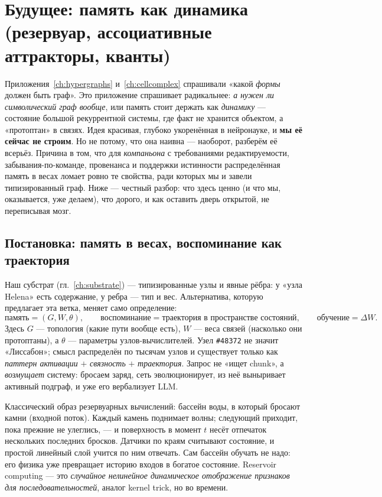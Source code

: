 \chapter{Будущее: память как динамика (резервуар, ассоциативные аттракторы, кванты)}
\label{ch:dynamical}

\begin{pitfall}
Приложения~\ref{ch:hypergraphs} и~\ref{ch:cellcomplex} спрашивали «какой \emph{формы} должен
быть граф». Это приложение спрашивает радикальнее: \emph{а нужен ли символический граф
вообще}, или память стоит держать как \emph{динамику} — состояние большой рекуррентной
системы, где факт не хранится объектом, а «протоптан» в связях. Идея красивая, глубоко
укоренённая в нейронауке, и \textbf{мы её сейчас не строим}. Но не потому, что она наивна —
наоборот, разберём её всерьёз. Причина в том, что для \emph{компаньона} с требованиями
редактируемости, забывания-по-команде, провенанса и поддержки истинности распределённая
память в весах ломает ровно те свойства, ради которых мы и завели типизированный граф. Ниже
— честный разбор: что здесь ценно (и что мы, оказывается, уже делаем), что дорого, и как
оставить дверь открытой, не переписывая мозг.
\end{pitfall}

\section{Постановка: память в весах, воспоминание как траектория}

Наш субстрат (гл.~\ref{ch:substrate}) — типизированные узлы и явные рёбра: у «узла Helena»
есть содержание, у ребра — тип и вес. Альтернатива, которую предлагает эта ветка, меняет
само определение:
\[
\text{память} = (G, W, \theta),\qquad
\text{воспоминание} = \text{траектория в пространстве состояний},\qquad
\text{обучение} = \Delta W .
\]
Здесь $G$ — топология (какие пути вообще есть), $W$ — веса связей (насколько они
протоптаны), а $\theta$ — параметры узлов-вычислителей. Узел \texttt{\#48372} не значит
«Лиссабон»; смысл распределён по тысячам узлов и существует только как \emph{паттерн
активации} $+$ \emph{связность} $+$ \emph{траектория}. Запрос не «ищет chunk», а
\emph{возмущает} систему: бросаем заряд, сеть эволюционирует, из неё выныривает активный
подграф, и уже его вербализует LLM.

\begin{intuition}
Классический образ резервуарных вычислений: бассейн воды, в который бросают камни (входной
поток). Каждый камень поднимает волны; следующий приходит, пока прежние не улеглись, — и
поверхность в момент $t$ несёт отпечаток нескольких последних бросков. Датчики по краям
считывают состояние, и простой линейный слой учится по ним отвечать. Сам бассейн обучать не
надо: его физика уже превращает историю входов в богатое состояние. Reservoir computing —
это \emph{случайное нелинейное динамическое отображение признаков для последовательностей},
аналог kernel trick, но во времени.
\end{intuition}

